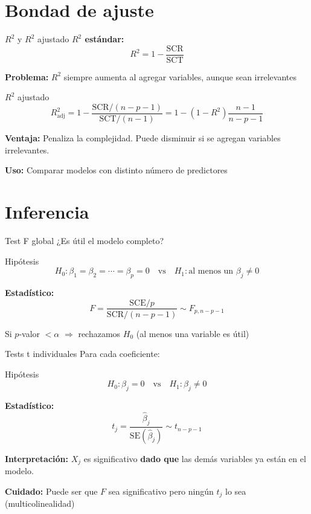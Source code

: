 \documentclass[aspectratio=169]{beamer}
\begin{document}
\section{Bondad de ajuste}

\begin{frame}{$R^2$ y $R^2$ ajustado}
\textbf{$R^2$ estándar:}
\[
R^2 = 1 - \frac{\text{SCR}}{\text{SCT}}
\]

\textbf{Problema:} $R^2$ siempre aumenta al agregar variables, aunque sean irrelevantes

\vspace{0.5cm}
\begin{block}{$R^2$ ajustado}
\[
R^2_{\text{adj}} = 1 - \frac{\text{SCR}/(n-p-1)}{\text{SCT}/(n-1)} = 1 - (1-R^2)\frac{n-1}{n-p-1}
\]
\end{block}

\vspace{0.3cm}
\textbf{Ventaja:} Penaliza la complejidad. Puede disminuir si se agregan variables irrelevantes.

\vspace{0.3cm}
\textbf{Uso:} Comparar modelos con distinto número de predictores
\end{frame}

\section{Inferencia}

\begin{frame}{Test F global}
¿Es útil el modelo completo?

\begin{block}{Hipótesis}
\[
H_0: \beta_1 = \beta_2 = \cdots = \beta_p = 0 \quad \text{vs} \quad H_1: \text{al menos un } \beta_j \neq 0
\]
\end{block}

\textbf{Estadístico:}
\[
F = \frac{\text{SCE}/p}{\text{SCR}/(n-p-1)} \sim F_{p, n-p-1}
\]

\vspace{0.3cm}
Si $p$-valor $< \alpha$ $\Rightarrow$ rechazamos $H_0$ (al menos una variable es útil)
\end{frame}

\begin{frame}{Tests t individuales}
Para cada coeficiente:

\begin{block}{Hipótesis}
\[
H_0: \beta_j = 0 \quad \text{vs} \quad H_1: \beta_j \neq 0
\]
\end{block}

\textbf{Estadístico:}
\[
t_j = \frac{\hat{\beta}_j}{\text{SE}(\hat{\beta}_j)} \sim t_{n-p-1}
\]

\vspace{0.5cm}
\textbf{Interpretación:} $X_j$ es significativo \textbf{dado que} las demás variables ya están en el modelo.

\vspace{0.3cm}
\textbf{Cuidado:} Puede ser que $F$ sea significativo pero ningún $t_j$ lo sea (multicolinealidad)
\end{frame}
\end{document}
